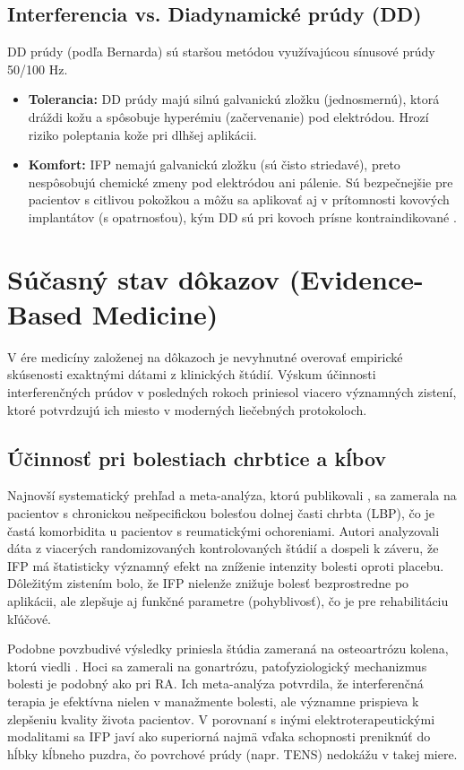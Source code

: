 \subsection{Interferencia vs. Diadynamické prúdy (DD)}
DD prúdy (podľa Bernarda) sú staršou metódou využívajúcou sínusové prúdy 50/100 Hz.
\begin{itemize}
    \item \textbf{Tolerancia:} DD prúdy majú silnú galvanickú zložku (jednosmernú), ktorá dráždi kožu a spôsobuje hyperémiu (začervenanie) pod elektródou. Hrozí riziko poleptania kože pri dlhšej aplikácii.
    \item \textbf{Komfort:} IFP nemajú galvanickú zložku (sú čisto striedavé), preto nespôsobujú chemické zmeny pod elektródou ani pálenie. Sú bezpečnejšie pre pacientov s citlivou pokožkou a môžu sa aplikovať aj v prítomnosti kovových implantátov (s opatrnosťou), kým DD sú pri kovoch prísne kontraindikované \parencite{Podebradsky2009}.
\end{itemize}

\section{Súčasný stav dôkazov (Evidence-Based Medicine)}

V ére medicíny založenej na dôkazoch je nevyhnutné overovať empirické skúsenosti exaktnými dátami z klinických štúdií. Výskum účinnosti interferenčných prúdov v posledných rokoch priniesol viacero významných zistení, ktoré potvrdzujú ich miesto v moderných liečebných protokoloch.

\subsection{Účinnosť pri bolestiach chrbtice a kĺbov}
Najnovší systematický prehľad a meta-analýza, ktorú publikovali \textcite{Rampazo2023}, sa zamerala na pacientov s chronickou nešpecifickou bolesťou dolnej časti chrbta (LBP), čo je častá komorbidita u pacientov s reumatickými ochoreniami. Autori analyzovali dáta z viacerých randomizovaných kontrolovaných štúdií a dospeli k záveru, že IFP má štatisticky významný efekt na zníženie intenzity bolesti oproti placebu. Dôležitým zistením bolo, že IFP nielenže znižuje bolesť bezprostredne po aplikácii, ale zlepšuje aj funkčné parametre (pohyblivosť), čo je pre rehabilitáciu kľúčové.

Podobne povzbudivé výsledky priniesla štúdia zameraná na osteoartrózu kolena, ktorú viedli \textcite{Chen2022}. Hoci sa zamerali na gonartrózu, patofyziologický mechanizmus bolesti je podobný ako pri RA. Ich meta-analýza potvrdila, že interferenčná terapia je efektívna nielen v manažmente bolesti, ale významne prispieva k zlepšeniu kvality života pacientov. V porovnaní s inými elektroterapeutickými modalitami sa IFP javí ako superiorná najmä vďaka schopnosti preniknúť do hĺbky kĺbneho puzdra, čo povrchové prúdy (napr. TENS) nedokážu v takej miere.

